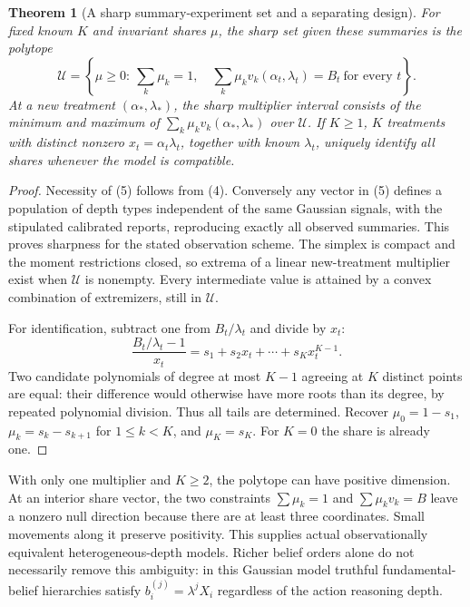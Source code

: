 \documentclass[11pt]{article}
\newtheorem{theorem}{Theorem}
\theoremstyle{remark}
\begin{document}
\begin{theorem}[A sharp summary-experiment set and a separating design]
For fixed known $K$ and invariant shares $\mu$, the sharp set given these summaries is the polytope
\[
 \mathcal U=\left\{\mu\geq0:\ \sum_k\mu_k=1,\quad
 \sum_k\mu_kv_k(\alpha_t,\lambda_t)=B_t\ \text{for every }t\right\}. \tag{5}
\]
At a new treatment $(\alpha_*,\lambda_*)$, the sharp multiplier interval consists of the minimum and maximum of $\sum_k\mu_kv_k(\alpha_*,\lambda_*)$ over $\mathcal U$. If $K\geq1$, $K$ treatments with distinct nonzero $x_t=\alpha_t\lambda_t$, together with known $\lambda_t$, uniquely identify all shares whenever the model is compatible.
\end{theorem}
\begin{proof}
Necessity of (5) follows from (4). Conversely any vector in (5) defines a population of depth types independent of the same Gaussian signals, with the stipulated calibrated reports, reproducing exactly all observed summaries. This proves sharpness for the stated observation scheme. The simplex is compact and the moment restrictions closed, so extrema of a linear new-treatment multiplier exist when $\mathcal U$ is nonempty. Every intermediate value is attained by a convex combination of extremizers, still in $\mathcal U$.

For identification, subtract one from $B_t/\lambda_t$ and divide by $x_t$:
\[
 \frac{B_t/\lambda_t-1}{x_t}
      =s_1+s_2x_t+\cdots+s_Kx_t^{K-1}.
\]
Two candidate polynomials of degree at most $K-1$ agreeing at $K$ distinct points are equal: their difference would otherwise have more roots than its degree, by repeated polynomial division. Thus all tails are determined. Recover $\mu_0=1-s_1$, $\mu_k=s_k-s_{k+1}$ for $1\leq k<K$, and $\mu_K=s_K$. For $K=0$ the share is already one.
\end{proof}

With only one multiplier and $K\geq2$, the polytope can have positive dimension. At an interior share vector, the two constraints $\sum\mu_k=1$ and $\sum\mu_kv_k=B$ leave a nonzero null direction because there are at least three coordinates. Small movements along it preserve positivity. This supplies actual observationally equivalent heterogeneous-depth models. Richer belief orders alone do not necessarily remove this ambiguity: in this Gaussian model truthful fundamental-belief hierarchies satisfy $b_i^{(j)}=\lambda^jX_i$ regardless of the action reasoning depth.
\end{document}
